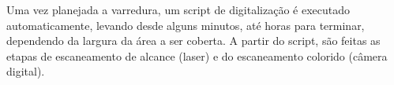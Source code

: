 Uma vez planejada a varredura, um script de digitalização é executado automaticamente, levando desde alguns minutos, até horas para terminar, dependendo da largura da área a ser coberta.
A partir do script, são feitas as etapas de escaneamento de alcance (laser) e do escaneamento colorido (câmera digital).




